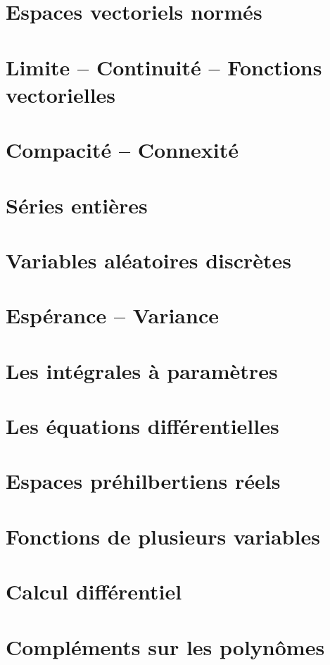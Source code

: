 \documentclass{report}
\begin{document}
\chapter{Espaces vectoriels normés}

\chapter{Limite -- Continuité -- Fonctions vectorielles}

\chapter{Compacité -- Connexité}

\chapter{Séries entières}

\chapter{Variables aléatoires discrètes}

\chapter{Espérance -- Variance}

\chapter{Les intégrales à paramètres}

\chapter{Les équations différentielles}

\chapter{Espaces préhilbertiens réels}

\chapter{Fonctions de plusieurs variables}

\chapter{Calcul différentiel}



\chapter{Compléments sur les polynômes}



\printindex
\end{document}
